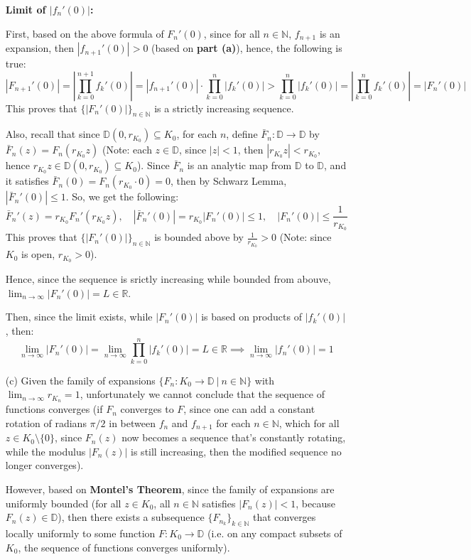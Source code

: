 \documentclass{article}
\begin{document}
\begin{itemize}
    \textbf{Limit of $|f_n'(0)|$:}

    First, based on the above formula of $F_n'(0)$, since for all $n\in\mathbb{N}$, $f_{n+1}$ is an expansion, then $|f_{n+1}'(0)|>0$ (based on \textbf{part (a)}), hence, the following is true:
    $$|F_{n+1}'(0)|=\left|\prod_{k=0}^{n+1}f_k'(0)\right| = |f_{n+1}'(0)|\cdot\prod_{k=0}^{n}|f_k'(0)| > \prod_{k=0}^{n}|f_k'(0)| = \left|\prod_{k=0}^{n}f_k'(0)\right|=|F_n'(0)|$$
    This proves that $\{|F_{n}'(0)|\}_{n\in\mathbb{N}}$ is a strictly increasing sequence.

    Also, recall that since $\mathbb{D}(0,r_{K_0})\subseteq K_0$, for each $n$, define $\bar{F}_n:\mathbb{D}\rightarrow\mathbb{D}$ by $\bar{F}_n(z)=F_n(r_{K_0}z)$ (Note: each $z\in \mathbb{D}$, since $|z|<1$, then $|r_{K_0}z|<r_{K_0}$, hence $r_{K_0}z\in \mathbb{D}(0,r_{K_0})\subseteq K_0$).
    Since $\bar{F}_n$ is an analytic map from $\mathbb{D}$ to $\mathbb{D}$, and it satisfies $\bar{F}_n(0)=F_n(r_{K_0}\cdot 0)=0$, then by Schwarz Lemma, $|\bar{F}_n'(0)|\leq 1$. So, we get the following:
    $$\bar{F}_n'(z)=r_{K_0}F_n'(r_{K_0}z),\quad |\bar{F}_n'(0)|=r_{K_0}|F_n'(0)| \leq 1,\quad |F_n'(0)|\leq \frac{1}{r_{K_0}}$$
    This proves that $\{|F_{n}'(0)|\}_{n\in\mathbb{N}}$ is bounded above by $\frac{1}{r_{K_0}}>0$ (Note: since $K_0$ is open, $r_{K_0}>0$).

    Hence, since the sequence is srictly increasing while bounded from abouve, $\lim_{n\rightarrow \infty}|F_n'(0)|=L\in\mathbb{R}$.

    Then, since the limit exists, while $|F_n'(0)|$ is based on products of $|f_k'(0)|$, then:
    $$\lim_{n\rightarrow\infty}|F_n'(0)|=\lim_{n\rightarrow\infty}\prod_{k=0}^{n}|f_k'(0)|=L\in\mathbb{R} \implies \lim_{n\rightarrow\infty}|f_n'(0)|=1$$

    \hfil

    \item[(c)] Given the family of expansions $\{F_n:K_0\rightarrow\mathbb{D}\ |\ n\in\mathbb{N}\}$ with $\lim_{n\rightarrow\infty}r_{K_n}=1$, unfortunately we cannot conclude that the sequence of functions converges (if $F_n$ converges to $F$, since one can add a constant rotation of radians $\pi/2$ in between $f_n$ and $f_{n+1}$ for each $n\in\mathbb{N}$,
    which for all $z\in K_0\setminus\{0\}$, since $F_n(z)$ now becomes a sequence that's constantly rotating, while the modulus $|F_n(z)|$ is still increasing, then the modified sequence no longer converges).

    However, based on \textbf{Montel's Theorem}, since the family of expansions are uniformly bounded (for all $z\in K_0$, all $n\in\mathbb{N}$ satisfies $|F_n(z)|<1$, because $F_n(z)\in\mathbb{D}$), then there exists a subsequence $\{F_{n_k}\}_{k\in\mathbb{N}}$ that converges locally uniformly to some function $F:K_0\rightarrow\mathbb{D}$ (i.e. on any compact subsets of $K_0$, the sequence of functions converges uniformly).
    

\end{itemize}
\end{document}
